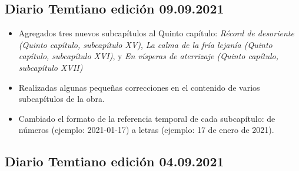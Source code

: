 \documentclass[
  spanish,
]{book}
\begin{document}
\hypertarget{diario-temtiano-ediciuxf3n-09.09.2021}{%
\subsection*{Diario Temtiano edición 09.09.2021}\label{diario-temtiano-ediciuxf3n-09.09.2021}}

\begin{itemize}
\item
  Agregados tres nuevos subcapítulos al Quinto capítulo: \emph{Récord de desoriente (Quinto capítulo, subcapítulo XV)}, \emph{La calma de la fría lejanía (Quinto capítulo, subcapítulo XVI)}, y \emph{En vísperas de aterrizaje (Quinto capítulo, subcapítulo XVII)}
\item
  Realizadas algunas pequeñas correcciones en el contenido de varios subcapítulos de la obra.
\item
  Cambiado el formato de la referencia temporal de cada subcapítulo: de números (ejemplo: 2021-01-17) a letras (ejemplo: 17 de enero de 2021).
\end{itemize}

\hypertarget{diario-temtiano-ediciuxf3n-04.09.2021}{%
\subsection*{Diario Temtiano edición 04.09.2021}\label{diario-temtiano-ediciuxf3n-04.09.2021}}
\end{document}
